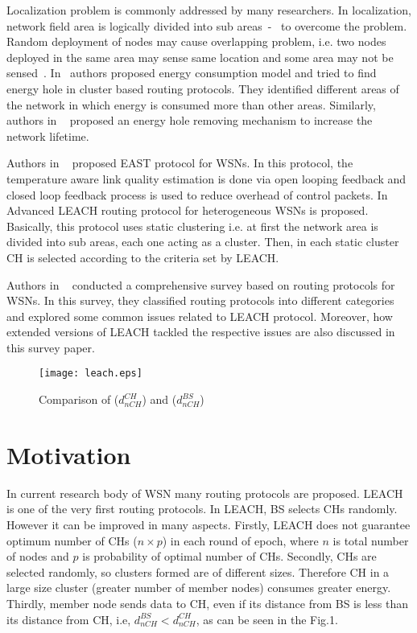 \documentclass[journal]{IEEEtran}
\begin{document}
Localization problem is commonly addressed by many researchers. In localization, network ﬁeld area is logically divided into sub areas~\cite{R11}-~\cite{R12} to overcome the problem. Random deployment of nodes may cause overlapping problem, i.e. two nodes deployed in the same area may sense same location and some area may not be sensed~\cite{R13}. In~\cite{R14} authors proposed energy consumption model and tried to ﬁnd energy hole in cluster based routing protocols. They identiﬁed different areas of the network in which energy is consumed more than other areas. Similarly, authors in ~\cite{R15} proposed an energy hole removing mechanism to increase the network lifetime.

Authors in ~\cite{R16} proposed EAST protocol for WSNs. In this protocol, the temperature aware link quality estimation is done via open looping feedback and closed loop feedback process is used to reduce overhead of control packets. In ~\cite{R17} Advanced LEACH routing protocol for heterogeneous WSNs is proposed. Basically, this protocol uses static clustering i.e. at first the network area is divided into sub areas, each one acting as a cluster. Then, in each static cluster CH is selected according to the criteria set by LEACH.

Authors in ~\cite{R18} conducted a comprehensive survey based on routing protocols for WSNs. In this survey, they classified routing protocols into different categories and explored some common issues related to LEACH protocol. Moreover, how extended versions of LEACH tackled the respective issues are also discussed in this survey paper.

\begin{figure}[h]
\centering
\texttt{[image: leach.eps]}
\caption{Comparison of ($d_{nCH}^{CH}$) and ($d_{nCH}^{BS}$)}
\end{figure}
\section{Motivation}
In current research body of WSN many routing protocols are proposed. LEACH is one of the very first routing protocols. In LEACH, BS selects CHs randomly. However it can be improved in many aspects. Firstly, LEACH does not guarantee optimum number of CHs ($n\times p$) in each round of epoch, where $n$ is total number of nodes and $p$ is probability of optimal number of CHs. Secondly, CHs are selected randomly, so clusters formed are of different sizes. Therefore CH in a large size cluster (greater number of member nodes) consumes greater energy. Thirdly, member node sends data to CH, even if its distance from BS is less than its distance from CH, i.e, $d_{nCH}^{BS}<d_{nCH}^{CH}$, as can be seen in the Fig.1.
\end{document}
